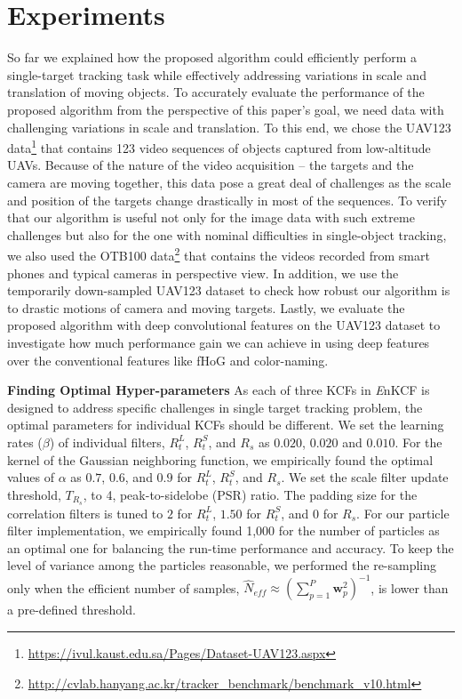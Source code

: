 \documentclass[10pt,twocolumn,letterpaper]{article}
\begin{document}
\section{Experiments} \label{sc:Experiments}
So far we explained how the proposed algorithm could efficiently
perform a single-target tracking task while effectively addressing
variations in scale and translation of moving objects. To accurately
evaluate the performance of the proposed algorithm from the
perspective of this paper's goal, we need data with challenging
variations in scale and translation. To this end, we chose the UAV123
data\footnote{\url{https://ivul.kaust.edu.sa/Pages/Dataset-UAV123.aspx}}\cite{mueller2016uav123}
that contains 123 video sequences of objects captured from
low-altitude UAVs. Because of the nature of the video acquisition --
the targets and the camera are moving together, this data pose a great
deal of challenges as the scale and position of the targets change
drastically in most of the sequences. To verify that our algorithm is
useful not only for the image data with such extreme challenges but
also for the one with nominal difficulties in single-object tracking,
we also used the OTB100
data\footnote{\url{http://cvlab.hanyang.ac.kr/tracker_benchmark/benchmark_v10.html}}
\cite{WuLimYang13} that contains the videos recorded from smart phones
and typical cameras in perspective view. In addition, we use the
temporarily down-sampled UAV123 dataset to check how robust our
algorithm is to drastic motions of camera and moving targets. Lastly,
we evaluate the proposed algorithm with deep convolutional features on
the UAV123 dataset to investigate how much performance gain we can
achieve in using deep features over the conventional features like
fHoG and color-naming.

\textbf{Finding Optimal Hyper-parameters} As each of three KCFs in
       {\it E}nKCF is designed to address specific challenges in
       single target tracking problem, the optimal parameters for
       individual KCFs should be different. We set the learning rates
       ($\beta$) of individual filters, $R_{t}^{L}$, $R_{t}^{S}$, and
       $R_{s}$ as $0.020$, $0.020$ and $0.010$. For the kernel of the
       Gaussian neighboring function, we empirically found the optimal
       values of $\alpha$ as $0.7$, $0.6$, and $0.9$ for $R_{t}^{L}$,
       $R_{t}^{S}$, and $R_{s}$. We set the scale filter update
       threshold, $T_{R_{s}}$, to 4, peak-to-sidelobe (PSR) ratio. The
       padding size for the correlation filters is tuned to $2$ for
       $R_{t}^{L}$, $1.50$ for $R_{t}^{S}$, and $0$ for $R_{s}$. For
       our particle filter implementation, we empirically found 1,000
       for the number of particles as an optimal one for balancing the
       run-time performance and accuracy. To keep the level of
       variance among the particles reasonable, we performed the
       re-sampling only when the efficient number of samples,
       $ \hat{N}_{eff} \approx
       (\sum_{p=1}^{P}\boldsymbol{w}_{p}^{2})^{-1} $, is lower than a
       pre-defined threshold.
\end{document}
